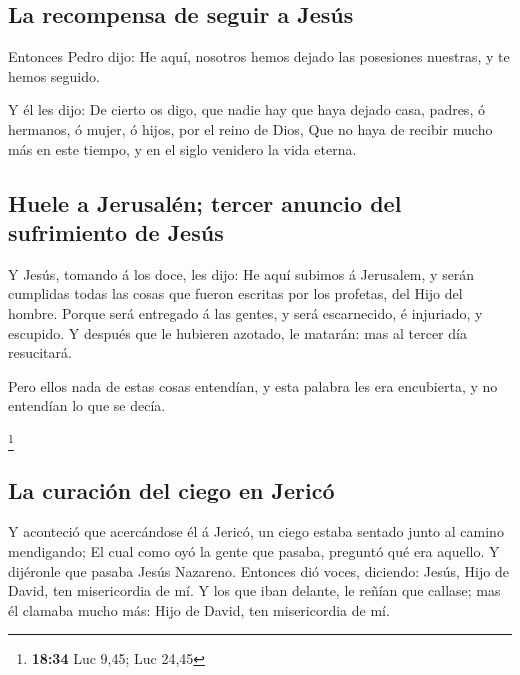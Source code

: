 \hypertarget{la-recompensa-de-seguir-a-jesuxfas}{%
\subsection{La recompensa de seguir a
Jesús}\label{la-recompensa-de-seguir-a-jesuxfas}}

 Entonces Pedro dijo: He aquí, nosotros hemos dejado las
posesiones nuestras, y te hemos seguido.

 Y él les dijo: De cierto os digo, que nadie hay que haya
dejado casa, padres, ó hermanos, ó mujer, ó hijos, por el reino de Dios,
 Que no haya de recibir mucho más en este tiempo, y en el
siglo venidero la vida eterna.

\hypertarget{huele-a-jerusaluxe9n-tercer-anuncio-del-sufrimiento-de-jesuxfas}{%
\subsection{Huele a Jerusalén; tercer anuncio del sufrimiento de
Jesús}\label{huele-a-jerusaluxe9n-tercer-anuncio-del-sufrimiento-de-jesuxfas}}

 Y Jesús, tomando á los doce, les dijo: He aquí subimos á
Jerusalem, y serán cumplidas todas las cosas que fueron escritas por los
profetas, del Hijo del hombre.  Porque será entregado á
las gentes, y será escarnecido, é injuriado, y escupido. 
Y después que le hubieren azotado, le matarán: mas al tercer día
resucitará.

 Pero ellos nada de estas cosas entendían, y esta palabra
les era encubierta, y no entendían lo que se decía.

\footnote{\textbf{18:34} Luc 9,45; Luc 24,45}

\hypertarget{la-curaciuxf3n-del-ciego-en-jericuxf3}{%
\subsection{La curación del ciego en
Jericó}\label{la-curaciuxf3n-del-ciego-en-jericuxf3}}

 Y aconteció que acercándose él á Jericó, un ciego estaba
sentado junto al camino mendigando;  El cual como oyó la
gente que pasaba, preguntó qué era aquello.  Y dijéronle
que pasaba Jesús Nazareno.  Entonces dió voces, diciendo:
Jesús, Hijo de David, ten misericordia de mí.  Y los que
iban delante, le reñían que callase; mas él clamaba mucho más: Hijo de
David, ten misericordia de mí.

